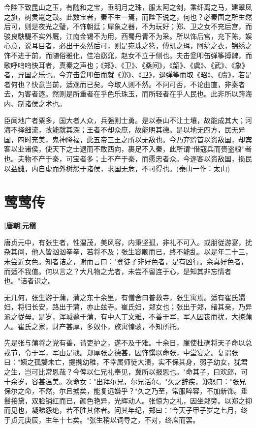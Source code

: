 \documentclass[UTF8,titlepage,oneside]{ctexbook}
\begin{document}
今陛下致昆山之玉，有随和之宝，垂明月之珠，服太阿之剑，乘纤离之马，建翠凤之旗，树灵鼍之鼓。此数宝者，秦不生一焉，而陛下说之，何也？必秦国之所生然后可，则是夜光之璧，不饰朝廷；犀象之器，不为玩好；郑、卫之女不充后宫，而骏良駃騠不实外厩，江南金锡不为用，西蜀丹青不为采。所以饰后宫，充下陈，娱心意，说耳目者，必出于秦然后可，则是宛珠之簪，傅玑之珥，阿缟之衣，锦绣之饰不进于前，而随俗雅化，佳冶窈窕，赵女不立于侧也。夫击瓮叩缶弹筝搏髀，而歌呼呜呜快耳者，真秦之声也；《郑》、《卫》、《桑间》，《韶》、《虞》、《武》、《象》者，异国之乐也。今弃击瓮叩缶而就《郑》、《卫》，退弹筝而取《昭》、《虞》，若是者何也？快意当前，适观而已矣。今取人则不然。不问可否，不论曲直，非秦者去，为客者逐。然则是所重者在乎色乐珠玉，而所轻者在乎人民也。此非所以跨海内、制诸侯之术也。

臣闻地广者粟多，国大者人众，兵强则士勇。是以泰山不让土壤，故能成其大；河海不择细流，故能就其深；王者不却众庶，故能明其德。是以地无四方，民无异国，四时充美，鬼神降福，此五帝三王之所以无敌也。今乃弃黔首以资敌国，却宾客以业诸侯，使天下之士退而不敢西向，裹足不入秦，此所谓“借寇兵而赍盗粮”者也。夫物不产于秦，可宝者多；士不产于秦，而愿忠者众。今逐客以资敌国，损民以益雠，内自虚而外树怨于诸侯，求国无危，不可得也。(泰山一作：太山)


\chapter*{莺莺传}
\begin{center}
	\textbf{[唐朝]元稹}
\end{center}

唐贞元中，有张生者，性温茂，美风容，内秉坚孤，非礼不可入。或朋従游宴，扰杂其间，他人皆汹汹拳拳，若将不及；张生容顺而已，终不能乱。以是年二十三，未尝近女色。知者诘之，谢而言曰："登徒子非好色者，是有凶行。余真好色者，而适不我值。何以言之？大凡物之尤者，未尝不留连于心，是知其非忘情者也。"诘者识之。

无几何，张生游于蒲，蒲之东十余里，有僧舍曰普救寺，张生寓焉。适有崔氏孀妇，将归长安，路出于蒲，亦止兹寺。崔氏妇，郑女也；张出于郑，绪其亲，乃异派之従母。是岁，浑瑊薨于蒲，有中人丁文雅，不善于军，军人因丧而扰，大掠蒲人。崔氏之家，财产甚厚，多奴仆，旅寓惶骇，不知所托。

先是张与蒲将之党有善，请吏护之，遂不及于难。十余日，廉使杜确将天子命以总戎节，令于军，军由是戢。郑厚张之德甚，因饰馔以命张，中堂宴之。复谓张曰："姨之孤嫠未亡，提携幼稚，不幸属师徒大溃，实不保其身，弱子幼女，犹君之生，岂可比常恩哉？今俾以仁兄礼奉见，冀所以报恩也。"命其子，曰欢郎，可十余岁，容甚温美。次命女："出拜尔兄，尔兄活尔。"久之辞疾，郑怒曰："张兄保尔之命，不然，尔且掳矣，能复远嫌乎？"久之乃至，常服睟容，不加新饰。垂鬟接黛，双脸销红而已，颜色艳异，光辉动人。张惊为之礼，因坐郑旁。以郑之抑而见也，凝睇怨绝，若不胜其体者。问其年纪，郑曰："今天子甲子岁之七月，终于贞元庚辰，生年十七矣。"张生稍以词导之，不对，终席而罢。
\end{document}
